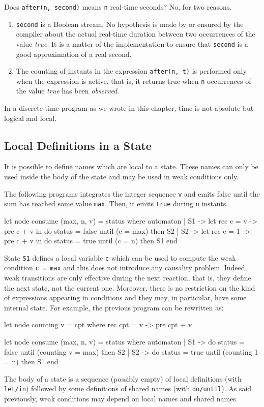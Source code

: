 \documentclass[11pt,titlepage,twoside]{report}
\begin{document}
Does \texttt{after(n, second)} means \texttt{n} real-time seconds? No, for two reasons.
\begin{enumerate}
\item
  \texttt{second} is a Boolean stream. No hypothesis is made by or
  ensured by the compiler about the
  actual real-time duration between two occurrences of the value
  \emph{true}. It is a matter of the implementation to ensure that
  \texttt{second} is a good approximation of a real second.
\item
  The counting of instants in the expression
  \texttt{after(n, t)} is performed only when the expression is active, that is,
  it returns true when \texttt{n} occurrences of the value \emph{true} has
  been \emph{observed}.
\end{enumerate}
In a discrete-time program as we wrote in this chapter, time is not absolute but
logical and local.
  
\subsection{Local Definitions in a State} %

It is possible to define names which are local to a state. These names
can only be used inside the body of the state and may be used in weak
conditions only.

The following programs integrates the integer sequence \verb-v- and
emits false until the sum has reached some value \verb-max-. Then, it
emits \verb-true- during \verb-n- instants.

\begin{runverbatim}
let node consume (max, n, v) = status where
  automaton
  | S1 ->
      let rec c = v -> pre c + v in
      do status = false
      until (c = max) then S2
  | S2 ->
      let rec c = 1 -> pre c + v in
      do status = true
      until (c = n) then S1
  end
\end{runverbatim}

State \verb-S1- defines a local variable \verb-c- which can be used to
compute the weak condition \verb-c = max- and this does not introduce
any causality problem. Indeed, weak transitions are only effective
during the next reaction, that is, they define the next state, not the
current one. Moreover, there is no restriction on the kind of
expressions appearing in conditions and they may, in particular, have
some internal state. For example, the previous program can be
rewritten as:

\begin{runverbatim}
let node counting v = cpt where
  rec cpt = v -> pre cpt + v

let node consume (max, n, v) = status where
  automaton
  | S1 ->
       do status = false
       until (counting v = max) then S2
  | S2 ->
       do status = true
       until (counting 1 = n) then S1
  end
\end{runverbatim}
The body of a state is a sequence (possibly empty) of local
definitions (with \verb-let/in-) followed by some definitions of
shared names (with \verb-do/until-). As said previously, weak
conditions may depend on local names and shared names.
\end{document}
